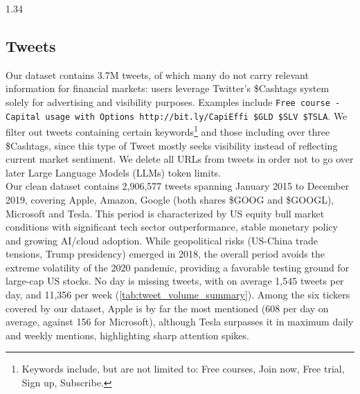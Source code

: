 \documentclass{article}
\begin{document}
\begin{setstretch}{1.34}
\subsection{Tweets}
Our dataset contains 3.7M tweets, of which many do not carry relevant information for financial markets: users leverage Twitter's \$Cashtags system solely for advertising and visibility purposes. Examples include \texttt{Free course - Capital usage with Options http://bit.ly/CapiEffi \$GLD \$SLV \$TSLA}. We filter out tweets containing certain keywords\footnote{Keywords include, but are not limited to: Free courses, Join now, Free trial, Sign up, Subscribe.} and those including over three \$Cashtags, since this type of Tweet mostly seeks visibility instead of reflecting current market sentiment. We delete all URLs from tweets in order not to go over later Large Language Models (LLMs) token limits. \\

Our clean dataset contains 2,906,577 tweets spanning January 2015 to December 2019, covering Apple, Amazon, Google (both shares \$GOOG and \$GOOGL), Microsoft and Tesla. This period is characterized by US equity bull market conditions with significant tech sector outperformance, stable monetary policy and growing AI/cloud adoption. While geopolitical risks (US-China trade tensions, Trump presidency) emerged in 2018, the overall period avoids the extreme volatility of the 2020 pandemic, providing a favorable testing ground for large-cap US stocks. No day is missing tweets, with on average 1,545 tweets per day, and 11,356 per week (\autoref{tab:tweet_volume_summary}). Among the six tickers covered by our dataset, Apple is by far the most mentioned (608 per day on average, against 156 for Microsoft), although Tesla surpasses it in maximum daily and weekly mentions, highlighting sharp attention spikes.\\



\end{setstretch}
\end{document}
